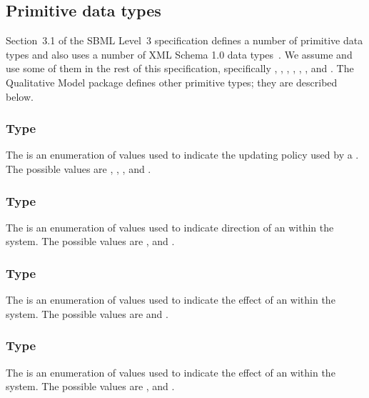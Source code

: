 
\subsection{Primitive data types}
\label{primitive-types}

Section~3.1 of the SBML Level~3 specification defines a number of
primitive data types and also uses a number of XML Schema 1.0 data
types~\citep{biron:2000}.  We assume and use some of them in the rest of
this specification, specifically , ,
, , ,
, and . The Qualitative Model package defines other primitive types;
they are described below.


\subsubsection{Type \fixttspace{}}
\label{primtype-temporisation}

The  is an enumeration of values used to indicate the updating policy used by a \Transition.  The possible values are , , ,  and .

\subsubsection{Type \fixttspace{}}
\label{primtype-sign}

The  is an enumeration of values used to indicate direction of an \Input within the system.  The possible values are ,  and .

\subsubsection{Type \fixttspace{}}
\label{primtype-inputeffect}
The  is an enumeration of values used to indicate the effect of an \Input \Transition within the system.  The possible values are  and .

\subsubsection{Type \fixttspace{}}
\label{primtype-outputeffect}
The  is an enumeration of values used to indicate the effect of an \Output \Transition within the system.  The possible values are ,  and .


